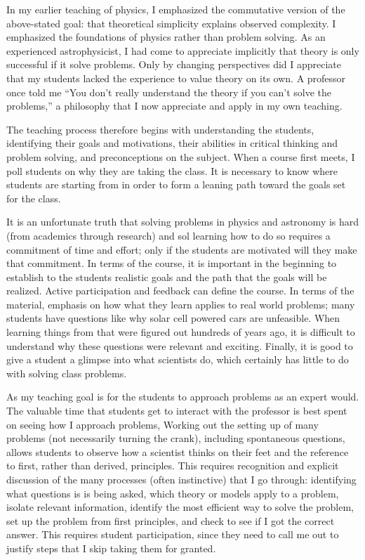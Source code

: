 \documentclass{article}
\begin{document}
In my earlier teaching of physics,  I emphasized the commutative version
of the above-stated goal: that theoretical simplicity explains observed complexity.  I  emphasized the foundations of physics
rather than problem solving. As an experienced astrophysicist, I had come to
appreciate implicitly that theory is only successful if it solve problems.  Only by changing perspectives
did I appreciate that my students lacked the experience
to value theory on its own.  A  professor once told me
``You don't really understand the theory if you can't solve the problems,'' a philosophy that I now  appreciate and
apply in my own teaching.


The teaching process therefore begins with understanding the students, identifying their goals and motivations, their abilities in critical thinking and
problem solving, and preconceptions on the subject.  When a course first meets, I poll students on why they are taking the
class.  It is necessary to know where students are starting from in order to form a leaning path toward the goals
set for the class. 

It is an unfortunate truth that solving problems in physics and astronomy is hard (from academics
through research) and sol learning how to do so requires a commitment of time and effort;
only if the students are motivated will they make that commitment.  In terms of the course,
it is important in the beginning to establish  to the students realistic goals and the path that the goals will be realized.
Active participation and feedback can define the course.
In terms of the material, emphasis on how what they learn applies to real world problems; many students have
questions 
like why solar cell powered cars are unfeasible.  When learning things from that were figured out
hundreds of years ago, it is difficult to understand why these questions were relevant and exciting.
Finally, it is good to give a student a glimpse into what scientists do, which certainly has little to do with solving
class problems.

As my teaching goal is for the students to approach problems as an expert would.
The valuable time that students get to interact with the professor is best spent on
seeing how I approach problems,
Working out the setting up of many problems (not necessarily turning the crank),
including spontaneous questions, allows students to observe how a scientist thinks on their
feet and the reference to first, rather than derived, principles.
This requires recognition and explicit discussion of the many processes (often instinctive) that I go through:
identifying what questions is is being asked, which theory or models apply to a problem, isolate relevant
information, identify the most efficient way to solve the problem, set up the problem from first principles,
and check to see if I got the correct answer.
This requires student participation, since they need to call me out to justify steps that I skip taking them for granted.
\end{document}
